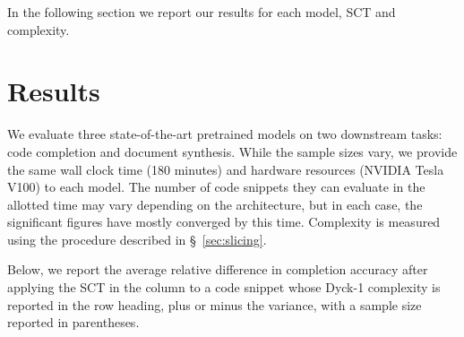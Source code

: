 \documentclass[sigconf,review,anonymous]{acmart}
\begin{document}
  In the following section we report our results for each model, SCT and complexity.

  \pagebreak\section{Results}\label{sec:results}

  We evaluate three state-of-the-art pretrained models on two downstream tasks: code completion and document synthesis. While the sample sizes vary, we provide the same wall clock time (180 minutes) and hardware resources (NVIDIA Tesla V100) to each model. The number of code snippets they can evaluate in the allotted time may vary depending on the architecture, but in each case, the significant figures have mostly converged by this time. Complexity is measured using the procedure described in \S~\ref{sec:slicing}.

  Below, we report the average relative difference in completion accuracy after applying the SCT in the column to a code snippet whose Dyck-1 complexity is reported in the row heading, plus or minus the variance, with a sample size reported in parentheses.
\end{document}
